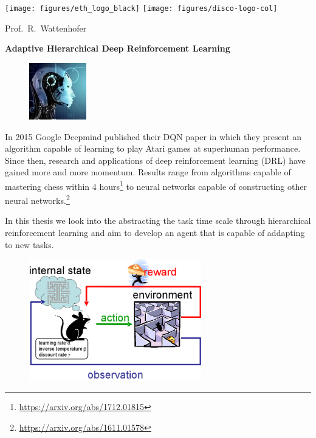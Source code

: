 \documentclass[a4paper,11pt]{article}
\begin{document}
	
\thispagestyle{empty}

\noindent
\hrulefill \vspace{6pt}

\noindent
\texttt{[image: figures/eth\_logo\_black]} \hfill
\texttt{[image: figures/disco-logo-col]} \hspace{-6pt} \vspace{-6pt}

\noindent \hrulefill \vspace{4pt}

\hfill Prof.\ R.\ Wattenhofer

\vspace{4pt}

\noindent \textbf{\LARGE Adaptive Hierarchical Deep Reinforcement Learning} \bigskip

\begin{figure}
	\vspace{-0.5cm}
	\includegraphics[width=2.5cm]{figures/robot}
\end{figure}

\noindent In 2015 Google Deepmind published their DQN paper in which they present an algorithm capable of learning to play Atari games at superhuman performance. Since then, research and applications of deep reinforcement learning (DRL) have gained more and more momentum. Results range from algorithms capable of mastering chess within 4 hours\footnote{\url{https://arxiv.org/abs/1712.01815}} to neural networks capable of constructing other neural networks.\footnote{\url{https://arxiv.org/abs/1611.01578}}

In this thesis we look into the abstracting the task time scale through hierarchical reinforcement learning and aim to develop an agent that is capable of addapting to new tasks.

\begin{figure}
	\vspace{-0.5cm}
	\includegraphics[width=7.5cm]{figures/rl_interaction}
\end{figure}
\end{document}
